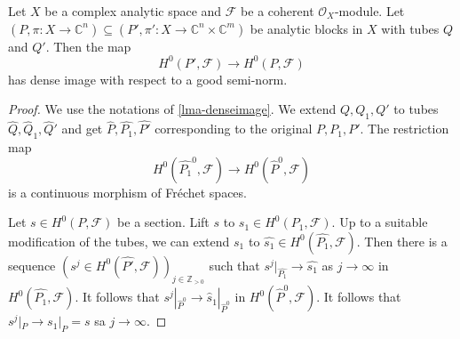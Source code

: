 \begin{thm}\label{thm-Rungapp}
    Let $X$ be a complex analytic space and $\mathcal{F}$ be a coherent $\mathcal{O}_X$-module. Let
    $(P,\pi:X\rightarrow  \mathbb{C}^n)\subseteq (P',\pi':X\rightarrow \mathbb{C}^n\times \mathbb{C}^m)$ be analytic blocks in $X$ with tubes $Q$ and $Q'$. Then the map 
    \[
        H^0(P',\mathcal{F})\rightarrow H^0(P,\mathcal{F})  
    \]
    has dense image with respect to a good semi-norm.
\end{thm}
\begin{proof}
    We use the notations of \cref{lma-denseimage}. We extend $Q,Q_1,Q'$ to tubes $\hat{Q},\hat{Q}_1,\hat{Q}'$ and get $\hat{P},\hat{P_1},\hat{P'}$ corresponding to the original $P,P_1,P'$. The restriction map
    \[
        H^0(\hat{P_1}^0,\mathcal{F})\rightarrow H^0(\hat{P}^0,\mathcal{F})
    \]
    is a continuous morphism of Fréchet spaces.

    Let $s\in H^0(P,\mathcal{F})$ be a section. Lift $s$ to $s_1\in H^0(P_1,\mathcal{F})$. Up to a suitable modification of the tubes, we can extend $s_1$ to $\hat{s_1}\in H^0(\hat{P_1},\mathcal{F})$. Then there is a sequence $(s^j\in H^0(\hat{P'},\mathcal{F}))_{j\in \mathbb{Z}_{>0}}$ such that $s^j|_{\hat{P_1}}\rightarrow \hat{s_1}$ as $j\to\infty$ in $H^0(\hat{P_1},\mathcal{F})$. It follows that $s^j|_{\hat{P}^0}\to \hat{s}_1|_{\hat{P}^0}$ in $H^0(\hat{P}^0,\mathcal{F})$. It follows that $s^j|_P\to s_1|_P=s$ sa $j\to\infty$.
\end{proof}

